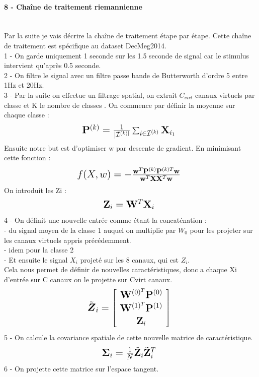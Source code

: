 \documentclass{article}[12pt]
\begin{document}
\paragraph{8 - Chaîne de traitement riemannienne}\mbox{}\\
Par la suite je vais décrire la chaîne de traitement étape par étape. Cette chaîne de traitement est spécifique au dataset DecMeg2014\cite{barachant_code_2019}.\\
1 - On garde uniquement 1 seconde sur les 1.5 seconde de signal car le stimulus intervient qu’après 0.5 seconde. \\
2 - On filtre le signal avec un filtre passe bande de Butterworth d'ordre 5 entre 1Hz et 20Hz.\\
3 - Par la suite on effectue un filtrage spatial, on extrait $C_{virt}$ canaux virtuels par classe et K le nombre de classes \cite{rivet_xdawn_2009}. On commence par définir la moyenne sur chaque classe :
$$ \mbox{\Large $ 
\mathbf{P}^{(k)}=\frac{1}{ | \mathcal{I}^{(k) |}} \sum_{i \in \mathcal{I}^{(k)}} \mathbf{X}_{i_{1}}
$ } $$
Ensuite notre but est d'optimiser w par descente de gradient. En minimisant cette fonction :
$$ \mbox{\Large $ 
f(X,w)=- \frac{\mathbf{w}^{T} \mathbf{P}^{(k)} \mathbf{P}^{(k) T} \mathbf{w}}{\mathbf{w}^{T} \mathbf{X} \mathbf{X}^{T} \mathbf{w}}
$ } $$
On introduit les Zi :
$$ \mbox{\Large $ 
\mathbf{Z}_{i}=\mathbf{W}^{T} \mathbf{X}_{i}
$ } $$
4 - On définit une nouvelle entrée comme étant la concaténation :\\
- du signal moyen de la classe 1 auquel on multiplie par $W_{0}$ pour les projeter sur les canaux virtuels appris précédemment.\\
- idem pour la classe 2\\
- Et ensuite le signal $X_{i}$ projeté sur les 8 canaux, qui est $Z_{i}$.\\
Cela nous permet de définir de nouvelles caractéristiques, donc a chaque Xi d'entrée sur C canaux on le projette sur Cvirt canaux.
$$ \mbox{\Large $ 
\tilde{\boldsymbol{Z}}_{i}=\left[ \begin{array}{c}{\mathbf{W}^{(0)^{T}} \mathbf{P}^{(0)}} \\ {\mathbf{W}^{(1)^{T}} \mathbf{P}^{(1)}} \\ {\mathbf{Z}_{i}}\end{array}\right]
$ } $$
5 - On calcule la covariance spatiale de cette nouvelle matrice de caractéristique.
$$ \mbox{\Large $ 
\boldsymbol{\Sigma}_{i}=\frac{1}{N} \tilde{\mathbf{Z}}_{i} \tilde{\mathbf{Z}}_{i}^{T}
$ } $$
6 - On projette cette matrice sur l'espace tangent.\\
\end{document}
